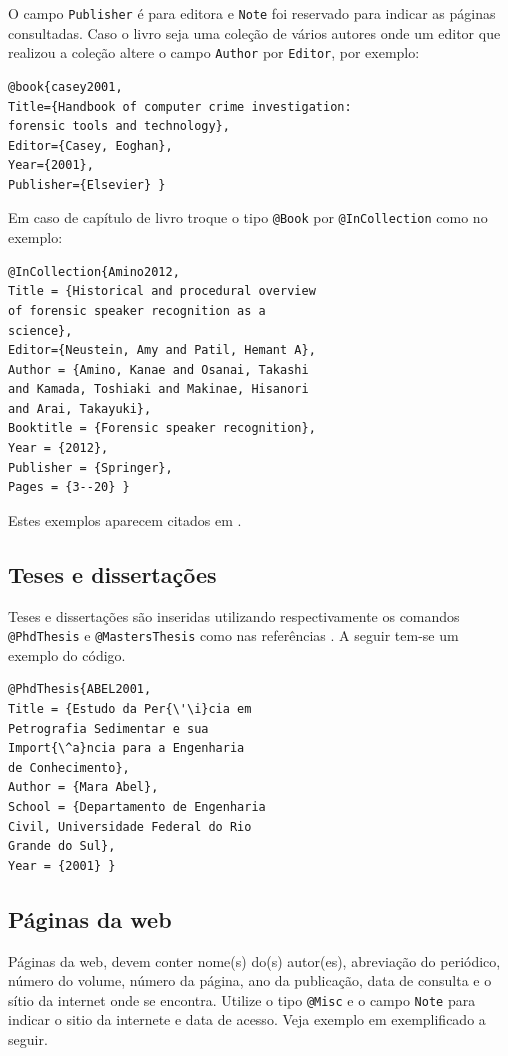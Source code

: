 \documentclass{RBClatex}
\begin{document}
O campo \verb|Publisher| é para editora e \verb|Note| foi reservado para indicar as páginas consultadas. Caso o livro seja uma coleção de vários autores onde um editor que realizou a coleção altere o campo \verb|Author| por \verb|Editor|, por exemplo: 
\begin{lstlisting}
@book{casey2001,
Title={Handbook of computer crime investigation: 
forensic tools and technology},
Editor={Casey, Eoghan},
Year={2001},
Publisher={Elsevier} }
\end{lstlisting}

Em caso de capítulo de livro troque o tipo \verb|@Book| por \verb|@InCollection| como no exemplo:
\begin{lstlisting}
@InCollection{Amino2012,
Title = {Historical and procedural overview 
of forensic speaker recognition as a 
science},
Editor={Neustein, Amy and Patil, Hemant A},
Author = {Amino, Kanae and Osanai, Takashi 
and Kamada, Toshiaki and Makinae, Hisanori 
and Arai, Takayuki},
Booktitle = {Forensic speaker recognition},
Year = {2012},
Publisher = {Springer},
Pages = {3--20} }
\end{lstlisting}

Estes exemplos aparecem citados em \cite{Fricke1990,Casey2001,Amino2012}. 

\subsection{Teses e dissertações}

Teses e dissertações são inseridas utilizando respectivamente os comandos \verb|@PhdThesis| e \verb|@MastersThesis| como nas referências \cite{ABEL2001,Silva2007}. A seguir tem-se um exemplo do código.

\begin{lstlisting}
@PhdThesis{ABEL2001,
Title = {Estudo da Per{\'\i}cia em 
Petrografia Sedimentar e sua 
Import{\^a}ncia para a Engenharia 
de Conhecimento},
Author = {Mara Abel},
School = {Departamento de Engenharia 
Civil, Universidade Federal do Rio 
Grande do Sul},
Year = {2001} }
\end{lstlisting} 

\subsection{Páginas da web}

Páginas da web, devem conter nome(s) do(s) autor(es), abreviação do periódico, número do volume, número da página, ano da publicação, data de consulta e o sítio da internet onde se encontra. Utilize o tipo \verb|@Misc| e o campo \verb|Note| para indicar o sitio da internete e data de acesso. Veja exemplo em \cite{DeMoore1999a} exemplificado a seguir.
\end{document}

